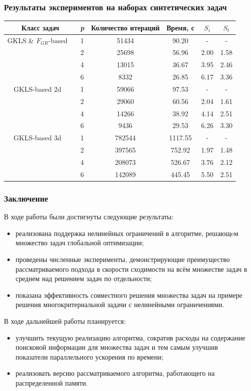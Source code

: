\documentclass[aspectratio=1610]{beamer}
\begin{document}
\begin{frame}
  \frametitle{Результаты экспериментов на наборах синтетических задач}
  \begin{table}
    \centering
    \begin{tabular}{c|c|c|c|c|c}
      Класс задач & \textit{p} & Количество итераций & Время, с & \(S_i\) & \(S_t\)   \\
      \hline
      GKLS \& \(F_{GR}\)-based \
        & 1 & 51434 & 90.20 & -    & - \\
        & 2 & 25698 & 56.96 & 2.00 & 1.58 \\
        & 4 & 13015 & 36.67 & 3.95 & 2.46 \\
        & 6 & 8332  & 26.85 & 6.17 & 3.36 \\
      \hline
      GKLS-based 2d \
        & 1 & 59066 & 97.53 & -    & - \\
        & 2 & 29060 & 60.56 & 2.04 & 1.61 \\
        & 4 & 14266 & 38.92 & 4.14 & 2.51 \\
        & 6 & 9436  & 29.53 & 6.26 & 3.30 \\
      \hline
      GKLS-based 3d \
        & 1 & 782544 & 1117.55 & -    & - \\
        & 2 & 397565 & 752.92  & 1.97 & 1.48 \\
        & 4 & 208073 & 526.67  & 3.76 & 2.12 \\
        & 6 & 142089 & 445.45  & 5.50 & 2.51 \\
      \hline
    \end{tabular}
  \end{table}
\end{frame}

\begin{frame}
  \frametitle{Заключение}
  В ходе работы были достигнуты следующие результаты:
    \begin{itemize}
      \item реализована поддержка нелинейных ограничений в алгоритме, решающeм
      множество задач глобальной оптимизации;
      \item проведены численные эксперименты, демонстрирующие преимущество рассматриваемого подхода в скорости сходимости на всём множестве задач в среднем над решением задач по отдельности;
      \item показана эффективность совместного решения множества задач на примере решения многокритериальной задачи с нелинейными ограничениями.
    \end{itemize}

    В ходе дальнейшей работы планируется:
    \begin{itemize}
      \item улучшить текущую реализацию алгоритма, сократив расходы на содержание поисковой информации для множества задач и тем самым улучшив
      показатели параллельного ускорения по времени;
      \item реализовать версию рассматриваемого алгоритма, работающего на распределенной памяти.
    \end{itemize}
\end{frame}
\end{document}
